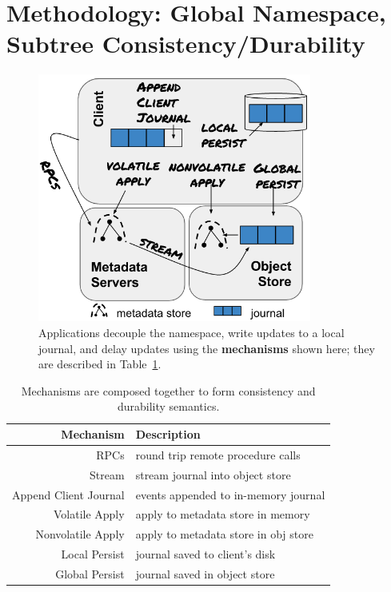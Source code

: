 \section{Methodology: Global Namespace, Subtree Consistency/Durability}
\label{sec:methodology-decoupled-namespaces}

\begin{figure}[tb]
\centering
\includegraphics[width=90mm]{figures/fig-decouple.png}
\caption{Applications decouple the namespace, write updates to a local journal,
and delay updates using the \textbf{mechanisms} shown here; they are described
in Table~\ref{table:mechanisms}.}\label{fig:decouple}
\end{figure}

\begin{table}
\begin{tabular}{ r | l }
  Mechanism         & Description \\\hline
  RPCs              & round trip remote procedure calls \\
  Stream            & stream journal into object store \\
  Append Client Journal & events appended to in-memory journal \\
  Volatile Apply & apply to metadata store in memory \\
  Nonvolatile Apply    & apply to metadata store in obj store \\
  Local Persist     & journal saved to client's disk \\
  Global Persist    & journal saved in object store \\
\end{tabular}
\caption{Mechanisms are composed together to form consistency and
durability semantics.\label{table:mechanisms}} 
\end{table}

